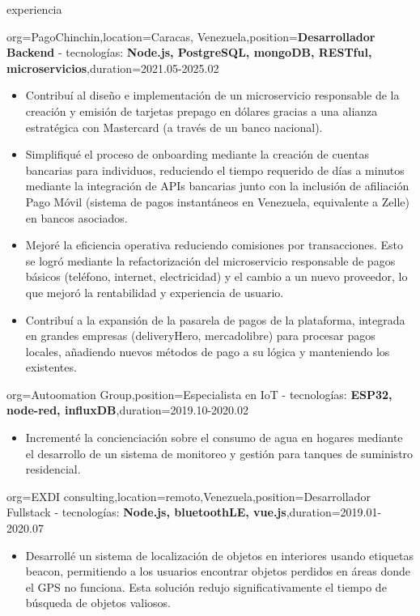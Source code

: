 \documentclass{resume}
\begin{document}
\begin{ResumeSection}{experiencia}
    \begin{ResumeSubsection}{org=PagoChinchin,location={Caracas, Venezuela},position={\textbf{Desarrollador Backend} - tecnologías: \textbf{Node.js, PostgreSQL, mongoDB, RESTful, microservicios}},duration=2021.05-2025.02}
        \begin{itemize}
            \item Contribuí al diseño e implementación de un microservicio responsable de la creación y emisión de tarjetas prepago en dólares gracias a una alianza estratégica con Mastercard (a través de un banco nacional).
            \item Simplifiqué el proceso de onboarding mediante la creación de cuentas bancarias para individuos, reduciendo el tiempo requerido de días a minutos mediante la integración de APIs bancarias junto con la inclusión de afiliación Pago Móvil (sistema de pagos instantáneos en Venezuela, equivalente a Zelle) en bancos asociados.
            \item Mejoré la eficiencia operativa reduciendo comisiones por transacciones. Esto se logró mediante la refactorización del microservicio responsable de pagos básicos (teléfono, internet, electricidad) y el cambio a un nuevo proveedor, lo que mejoró la rentabilidad y experiencia de usuario.
            \item Contribuí a la expansión de la pasarela de pagos de la plataforma, integrada en grandes empresas (deliveryHero, mercadolibre) para procesar pagos locales, añadiendo nuevos métodos de pago a su lógica y manteniendo los existentes.
        \end{itemize}
    \end{ResumeSubsection}
    \begin{ResumeSubsection}{org={Autoomation Group},position={Especialista en IoT - tecnologías: \textbf{ESP32, node-red, influxDB}},duration={2019.10-2020.02}}
        \begin{itemize}
            \item Incrementé la concienciación sobre el consumo de agua en hogares mediante el desarrollo de un sistema de monitoreo y gestión para tanques de suministro residencial.
        \end{itemize}
    \end{ResumeSubsection}
    
    \begin{ResumeSubsection}{org=EXDI consulting,location={remoto,Venezuela},position={Desarrollador Fullstack - tecnologías: \textbf{Node.js, bluetoothLE, vue.js}},duration={2019.01-2020.07}}
        \begin{itemize}
            \item Desarrollé un sistema de localización de objetos en interiores usando etiquetas beacon, permitiendo a los usuarios encontrar objetos perdidos en áreas donde el GPS no funciona. Esta solución redujo significativamente el tiempo de búsqueda de objetos valiosos.
        \end{itemize}
    \end{ResumeSubsection}
\end{ResumeSection}
\end{document}
